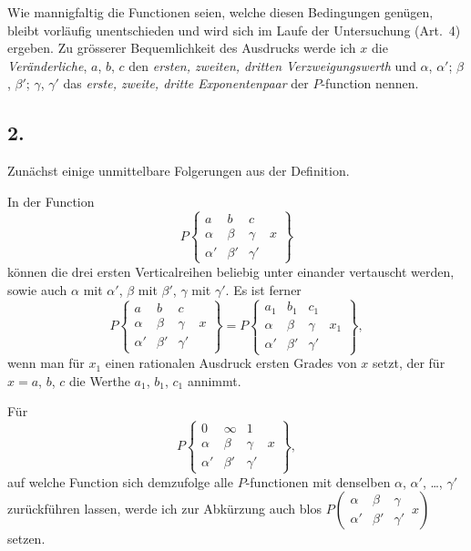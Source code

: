 \documentclass[12pt,a4paper]{article}
\begin{document}
Wie mannigfaltig die Functionen seien, welche diesen Bedingungen genügen, bleibt vorläufig unentschieden und wird sich im Laufe der Untersuchung (Art.~4) ergeben. Zu grösserer Bequemlichkeit des Ausdrucks werde ich $x$ die \textit{Veränderliche}, $a$, $b$, $c$ den \textit{ersten, zweiten, dritten Verzweigungswerth} und $\alpha$, $\alpha'$; $\beta$, $\beta'$; $\gamma$, $\gamma'$ das \textit{erste, zweite, dritte Exponentenpaar} der $P$-function nennen.

\subsection*{2.}

Zunächst einige unmittelbare Folgerungen aus der Definition.

In der Function
\[
P\left\{\begin{array}{ccc|c}
a & b & c & \\
\alpha & \beta & \gamma & x \\
\alpha' & \beta' & \gamma' &
\end{array}\right\}
\]
können die drei ersten Verticalreihen beliebig unter einander vertauscht werden, sowie auch $\alpha$ mit $\alpha'$, $\beta$ mit $\beta'$, $\gamma$ mit $\gamma'$. Es ist ferner
\[
P\left\{\begin{array}{ccc|c}
a & b & c & \\
\alpha & \beta & \gamma & x \\
\alpha' & \beta' & \gamma' &
\end{array}\right\}
= P\left\{\begin{array}{ccc|c}
a_1 & b_1 & c_1 & \\
\alpha & \beta & \gamma & x_1 \\
\alpha' & \beta' & \gamma' &
\end{array}\right\},
\]
wenn man für $x_1$ einen rationalen Ausdruck ersten Grades von $x$ setzt, der für $x = a$, $b$, $c$ die Werthe $a_1$, $b_1$, $c_1$ annimmt.

Für
\[
P\left\{\begin{array}{ccc|c}
0 & \infty & 1 & \\
\alpha & \beta & \gamma & x \\
\alpha' & \beta' & \gamma' &
\end{array}\right\},
\]
auf welche Function sich demzufolge alle $P$-functionen mit denselben $\alpha$, $\alpha'$, \dots, $\gamma'$ zurückführen lassen, werde ich zur Abkürzung auch blos $P\left(\begin{array}{ccc|} \alpha & \beta & \gamma \\ \alpha' & \beta' & \gamma' \end{array}\, x\right)$ setzen.
\end{document}
